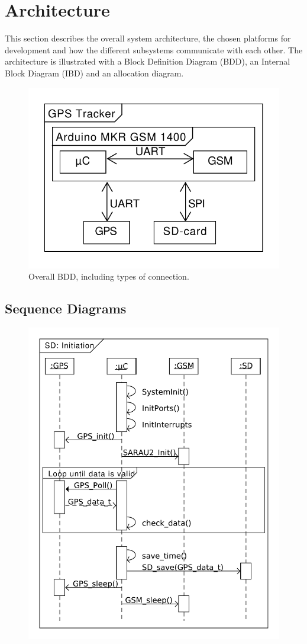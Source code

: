 
\chapter{Architecture}
\label{sec:Architecture}
This section describes the overall system architecture, the chosen platforms for development and how the different subsystems communicate with each other.
The architecture is illustrated with a Block Definition Diagram (BDD), an Internal Block Diagram (IBD) and an allocation diagram.

\begin{figure}[H]
	\centering
	\includegraphics[width=0.7\linewidth]{gfx/Design/Overall_BDD.pdf}
	\caption{Overall BDD, including types of connection.}
	\label{fig:BDD:overall}
\end{figure}

\section{Sequence Diagrams}

\begin{figure}
	\centering
	\includegraphics[width=0.7\linewidth]{gfx/Design/SD_init.pdf}
	\caption{}
	\label{fig:SD:init}
\end{figure}

